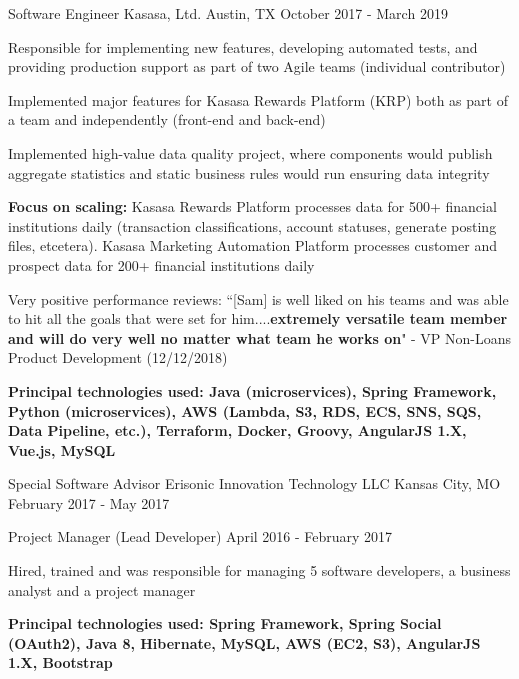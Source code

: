 \begin{cventries}
  \cventry
    {Software Engineer} %
    {Kasasa, Ltd.} %
    {Austin, TX} %
    {October 2017 - March 2019} %
    {
      \begin{cvitems} %
         \item{Responsible for implementing new features, developing automated tests, and providing production support as part of two Agile teams (individual contributor)}
 \item{Implemented major features for Kasasa Rewards Platform (KRP) both as part of a team and independently (front-end and back-end)}
 \item{Implemented high-value data quality project, where components would publish aggregate statistics and static business rules would run ensuring data integrity}
 \item{\textbf{Focus on scaling:} Kasasa Rewards Platform processes data for 500+ financial institutions daily (transaction classifications, account statuses, generate posting files, etcetera). Kasasa Marketing Automation Platform processes customer and prospect data for 200+ financial institutions daily}
 \item{Very positive performance reviews: ``[Sam] is well liked on his teams and was able to hit all the goals that were set for him....\textbf{extremely versatile team member and will do very well no matter what team he works on}" - VP Non-Loans Product Development (12/12/2018)}
 \item{\textbf{Principal technologies used: Java (microservices), Spring Framework, Python (microservices), AWS (Lambda, S3, RDS, ECS, SNS, SQS, Data Pipeline, etc.), Terraform, Docker, Groovy, AngularJS 1.X, Vue.js, MySQL}}
      \end{cvitems}
    }

  \cventry
    {Special Software Advisor} %
    {Erisonic Innovation Technology LLC} %
    {Kansas City, MO} %
    {February 2017 - May 2017} %
    {
    }
    
      \cventry
    {Project Manager (Lead Developer)} %
    {} %
    {} %
    {April 2016 - February 2017} %
    {
      \begin{cvitems} %
         \item{Hired, trained and was responsible for managing 5 software developers, a business analyst and a project manager}
 \item{\textbf{Principal technologies used: Spring Framework, Spring Social (OAuth2), Java 8, Hibernate,
MySQL, AWS (EC2, S3), AngularJS 1.X, Bootstrap}}
      \end{cvitems}
    }


\end{cventries}
